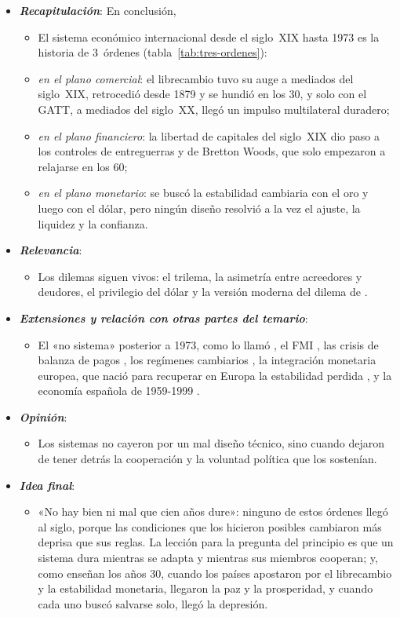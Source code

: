 \documentclass[11pt]{article}
\begin{document}
\begin{itemize}
\item \textbf{\emph{Recapitulación}}: En conclusión,
    \begin{itemize}
    \item El sistema económico internacional desde el siglo~XIX hasta 1973 es la historia de 3~órdenes (tabla~\ref{tab:tres-ordenes}):
    \item \emph{en el plano comercial}: el librecambio tuvo su auge a mediados del siglo~XIX, retrocedió desde 1879 y se hundió en los 30, y solo con el GATT, a mediados del siglo~XX, llegó un impulso multilateral duradero;
    \item \emph{en el plano financiero}: la libertad de capitales del siglo~XIX dio paso a los controles de entreguerras y de Bretton Woods, que solo empezaron a relajarse en los 60;
    \item \emph{en el plano monetario}: se buscó la estabilidad cambiaria con el oro y luego con el dólar, pero ningún diseño resolvió a la vez el ajuste, la liquidez y la confianza.
    \end{itemize}
\item \textbf{\emph{Relevancia}}:
  \begin{itemize}
  \item Los dilemas siguen vivos: el trilema, la asimetría entre acreedores y deudores, el privilegio del dólar y la versión moderna del dilema de .
  \end{itemize}
\item \textbf{\emph{Extensiones y relación con otras partes del temario}}:
  \begin{itemize}
  \item El «no sistema» posterior a 1973, como lo llamó  , el FMI , las crisis de balanza de pagos , los regímenes cambiarios , la integración monetaria europea, que nació para recuperar en Europa la estabilidad perdida , y la economía española de 1959-1999 .
  \end{itemize}
\item \textbf{\emph{Opinión}}:
  \begin{itemize}
  \item Los sistemas no cayeron por un mal diseño técnico, sino cuando dejaron de tener detrás la cooperación y la voluntad política que los sostenían.
  \end{itemize}
\item \textbf{\emph{Idea final}}:
  \begin{itemize}
  \item «No hay bien ni mal que cien años dure»: ninguno de estos órdenes llegó al siglo, porque las condiciones que los hicieron posibles cambiaron más deprisa que sus reglas. La lección para la pregunta del principio es que un sistema dura mientras se adapta y mientras sus miembros cooperan; y, como enseñan los años 30, cuando los países apostaron por el librecambio y la estabilidad monetaria, llegaron la paz y la prosperidad, y cuando cada uno buscó salvarse solo, llegó la depresión.
  \end{itemize}
\end{itemize}
\end{document}
